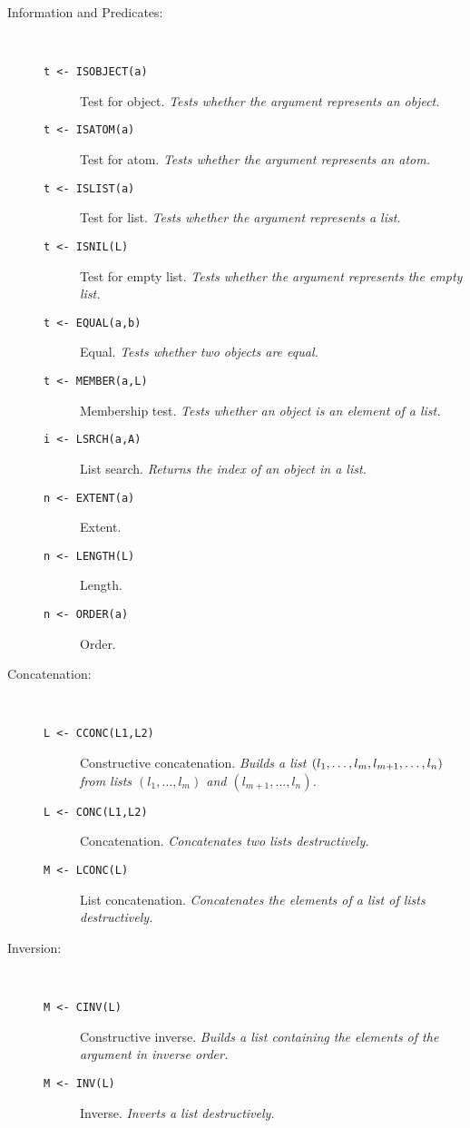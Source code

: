 \begin{description}
\item[Information and Predicates:] \ \
  \begin{description}
  \item[{\tt  t <- ISOBJECT(a) 
}]  Test for object. {\em Tests whether the argument
    represents an object.}
  \item[{\tt  t <- ISATOM(a) 
}]  Test for atom. {\em Tests whether the argument represents
  an atom.}
  \item[{\tt  t <- ISLIST(a) 
}]  Test for list. {\em Tests whether the argument represents
  a list.}
  \item[{\tt  t <- ISNIL(L) 
}]  Test for empty list. {\em Tests whether the argument
  represents the empty list.}
  \item[{\tt t <- EQUAL(a,b) 
}]  Equal. {\em Tests whether two objects are equal.}
  \item[{\tt t <- MEMBER(a,L) 
}]  Membership test. {\em Tests whether an object is an element of
  a list.}
  \item[{\tt i <- LSRCH(a,A) 
}]  List search. {\em Returns the index of an object in a list.}
  \item[{\tt n <- EXTENT(a) 
}]  Extent.
  \item[{\tt n <- LENGTH(L) 
}]  Length.
  \item[{\tt n <- ORDER(a) 
}]  Order.
  \end{description}

\item[Concatenation:] \ \
  \begin{description}
  \item[{\tt L <- CCONC(L1,L2) 
}]  Constructive concatenation. {\em Builds a list
    $(l_1,\ldots,l_m,\\l_{m+1},\ldots,l_n)$ from lists $(l_1,\ldots,l_m)$ and
    $(l_{m+1},\ldots,l_n)$.}
  \item[{\tt L <- CONC(L1,L2) 
}] Concatenation. {\em Concatenates two lists destructively.}
  \item[{\tt M <- LCONC(L) 
}]\index{LCONC}  List concatenation. {\em Concatenates the elements of a
    list of lists destructively.}
  \end{description}

\item[Inversion:] \ \
  \begin{description}
  \item[{\tt M <- CINV(L) 
}]\index{CINV}  Constructive inverse. {\em Builds a list containing the
    elements of the argument in inverse order.}
  \item[{\tt M <- INV(L) 
}]\index{INV}  Inverse. {\em Inverts a list destructively.}
  \end{description}


\end{description}
